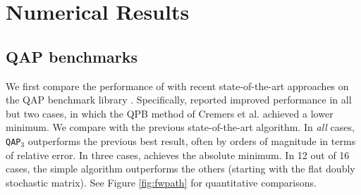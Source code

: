 \documentclass[10pt,journal,cspaper,compsoc]{IEEEtran}
\begin{document}



\section{Numerical Results} %
\label{sub:numerical_results}



\subsection{QAP benchmarks}

We first compare the performance of \qapm with recent state-of-the-art approaches on the QAP benchmark library \cite{Burkard1997}.  Specifically, \cite{Zaslavskiy2009} reported improved performance in all but two cases, in which the QPB method of Cremers et al. \cite{Schellewald2001} achieved a lower minimum.  We compare \qapm with the previous state-of-the-art algorithm.  In \emph{all} cases, \texttt{QAP}$_3$ outperforms the previous best result, often by orders of magnitude in terms of relative error. In three cases, \qapb achieves the absolute minimum.  In 12 out of 16 cases, the simple \qapa algorithm outperforms the others (starting with the flat doubly stochastic matrix).  See Figure \ref{fig:fwpath} for quantitative comparisons.
\end{document}

